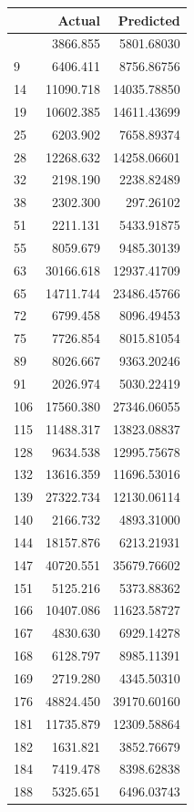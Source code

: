 \documentclass[
  12pt,
]{article}
\begin{document}
\begin{longtable}[]{@{}lrr@{}}
\toprule\noalign{}
& Actual & Predicted \\
\midrule\noalign{}
\endhead
\bottomrule\noalign{}
\endlastfoot
5 & 3866.855 & 5801.68030 \\
9 & 6406.411 & 8756.86756 \\
14 & 11090.718 & 14035.78850 \\
19 & 10602.385 & 14611.43699 \\
25 & 6203.902 & 7658.89374 \\
28 & 12268.632 & 14258.06601 \\
32 & 2198.190 & 2238.82489 \\
38 & 2302.300 & 297.26102 \\
51 & 2211.131 & 5433.91875 \\
55 & 8059.679 & 9485.30139 \\
63 & 30166.618 & 12937.41709 \\
65 & 14711.744 & 23486.45766 \\
72 & 6799.458 & 8096.49453 \\
75 & 7726.854 & 8015.81054 \\
89 & 8026.667 & 9363.20246 \\
91 & 2026.974 & 5030.22419 \\
106 & 17560.380 & 27346.06055 \\
115 & 11488.317 & 13823.08837 \\
128 & 9634.538 & 12995.75678 \\
132 & 13616.359 & 11696.53016 \\
139 & 27322.734 & 12130.06114 \\
140 & 2166.732 & 4893.31000 \\
144 & 18157.876 & 6213.21931 \\
147 & 40720.551 & 35679.76602 \\
151 & 5125.216 & 5373.88362 \\
166 & 10407.086 & 11623.58727 \\
167 & 4830.630 & 6929.14278 \\
168 & 6128.797 & 8985.11391 \\
169 & 2719.280 & 4345.50310 \\
176 & 48824.450 & 39170.60160 \\
181 & 11735.879 & 12309.58864 \\
182 & 1631.821 & 3852.76679 \\
184 & 7419.478 & 8398.62838 \\
188 & 5325.651 & 6496.03743 \\

\end{longtable}
\end{document}
